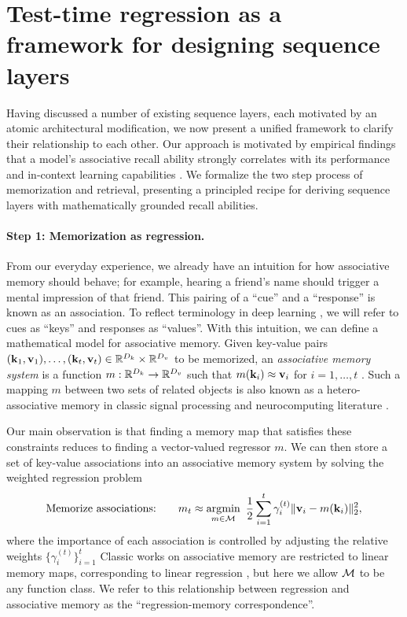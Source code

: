 \documentclass[notitlepage, 11pt]{article}
\newcommand*{\memory}{{m}}
\newcommand*{\dkey}{{D_k}}
\newcommand*{\dval}{{D_v}}
\begin{document}
\section{Test-time regression as a framework for designing sequence layers}\label{sec:duality}
Having discussed a number of existing sequence layers, each motivated by an atomic architectural modification, we now present a unified framework to clarify their relationship to each other.
Our approach is motivated by empirical findings that a model's associative recall ability strongly correlates with its performance and in-context learning capabilities \citep{Olsson2022ContextLearningInduction, Arora2023ZoologyMeasuringImproving}.
We formalize the two step process of memorization and retrieval, presenting a principled recipe for deriving sequence layers with mathematically grounded recall abilities.


\paragraph{Step 1: Memorization as regression.}
From our everyday experience, we already have an intuition for how associative memory should behave; for example, hearing a friend's name should trigger a mental impression of that friend.
This pairing of a ``cue'' and a ``response'' is known as an association.
To reflect terminology in deep learning \citep{Vaswani2017AttentionAllYou}, we will refer to cues as ``keys'' and responses as ``values''.
With this intuition, we can define a mathematical model for associative memory.
Given key-value pairs $(\kbf_1, \vbf_1), \ldots, (\kbf_t, \vbf_t) \in \reals^\dkey \times \reals^\dval$ to be memorized, an \emph{associative memory system} is a function $\memory: \reals^\dkey \to \reals^\dval$ such that $\memory(\kbf_i)\approx\vbf_i$ for $i=1, \ldots, t$ \citep{Kohonen1972CorrelationMatrixMemories,Kohonen1989SelfOrganizationAssociativeMemory}.
Such a mapping $\memory$ between two sets of related objects is also known as a hetero-associative memory in classic signal processing and neurocomputing literature \citep{Hinton1989ParallelModelsAssociative}.

Our main observation is that finding a memory map that satisfies these constraints reduces to finding a vector-valued regressor $\memory$.
We can then store a set of key-value associations into an associative memory system by solving the weighted regression problem
\begin{align}\label{eqn:general-least-squares}
    \text{Memorize associations:}\quad \quad \memory_t \approx \argmin_{\memory\in \Mcal}\ \frac{1}{2}\sum_{i=1}^t\gamma_i^{(t)}\norm{\vbf_i - \memory(\kbf_i)}_2^2,
\end{align}
where the importance of each association is controlled by adjusting the relative weights $\{\gamma_i^{(t)}\}_{i=1}^t$
Classic works on associative memory are restricted to linear memory maps, corresponding to linear regression  \citep[Chapter 6.6]{Kohonen1989SelfOrganizationAssociativeMemory}, but here we allow $\mathcal{M}$ to be any function class.
We refer to this relationship between regression and associative memory as the ``regression-memory correspondence''.
\end{document}
